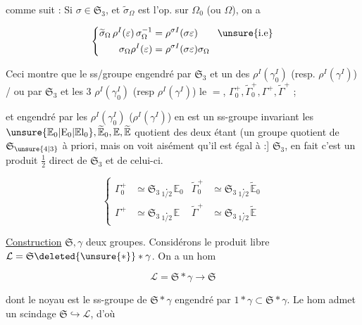  comme suit : Si $\sigma\in\mathfrak S_3$, et $\widetilde\sigma_\Omega$ est l'op. sur $\Omega_0$ (ou $\Omega$), on a

\[
 \left\{\begin{aligned}
 \widetilde\sigma_\Omega\,\rho^I(\varepsilon)\,\sigma_\Omega^{-1}
 &=\rho^{\sigma I}(\sigma\varepsilon)\qquad\text{\unsure{i.e}}\\
 \sigma_\Omega\rho^I(\varepsilon)&=\rho^{\sigma I}(\sigma\varepsilon)\sigma_\Omega
 \end{aligned}\right.
\]

Ceci montre que le ss/groupe  engendré par $\mathfrak S_3$ et un des $\rho^I(\gamma_0^I)$ (resp. $\rho^I(\gamma^I)$) /  ou par $\mathfrak S_3$ et  les $3$ $\rho^I(\gamma_0^I)$ (resp $\rho^I(\gamma^I)$)  le $=$,  $\Gamma_0^+,\widetilde\Gamma_0^+,\Gamma^+,\widetilde\Gamma^+$ ;


et   engendré par les $\rho^I(\gamma_0^I)$ ($\rho^I(\gamma^I)$) en est un ss-groupe invariant  les $\unsure{\mathbb E_0|\mathrm E_0|\mathbb E\mathrm l_0},\widetilde{\mathbb E}_0,\mathbb E,\widetilde{\mathbb E}$  quotient des deux étant  (un groupe quotient de $\mathfrak S_{\unsure{4|3}}$ à priori, mais on voit aisément qu'il est égal à :] $\mathfrak S_3$, en fait c'est un produit $\tfrac12$ direct de $\mathfrak S_3$ et de celui-ci.


\[
 \left\{\begin{aligned}
 \Gamma_0^+&\simeq\mathfrak S_3\underset{1/2}{\cdot}\mathbb E_0&
 \widetilde\Gamma_0^+&\simeq\mathfrak S_3\underset{1/2}{\cdot}\widetilde{\mathbb E}_0\\
 \Gamma^+&\simeq\mathfrak S_3\underset{1/2}{\cdot}\mathbb E&
 \widetilde\Gamma^+&\simeq\mathfrak S_3\underset{1/2}{\cdot}\widetilde{\mathbb E}
 \end{aligned}\right.
\]


\uline{Construction}  $\mathfrak S,\gamma$ deux groupes. Considérons le produit libre $\mathcal L=\mathfrak S\deleted{\unsure{*}}*\gamma$. On a un hom

\[
 \mathcal L=\mathfrak S*\gamma\longrightarrow\mathfrak S
\]

dont le noyau est le ss-groupe  de  $\mathfrak S*\gamma$ engendré par $1*\gamma\subset\mathfrak S*\gamma$. Le  hom admet un scindage  $\mathfrak S\hookrightarrow\mathcal L$, d'où
